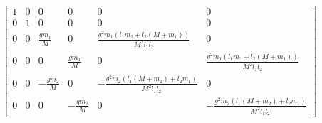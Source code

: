\documentclass[preview]{standalone}
\begin{document}
\begin{align*}
\left[\begin{matrix}1 & 0 & 0 & 0 & 0 & 0\\0 & 1 & 0 & 0 & 0 & 0\\0 & 0 & \frac{g m_{1}}{M} & 0 & \frac{g^{2} m_{1} \left(l_{1} m_{2} + l_{2} \left(M + m_{1}\right)\right)}{M^{2} l_{1} l_{2}} & 0\\0 & 0 & 0 & \frac{g m_{1}}{M} & 0 & \frac{g^{2} m_{1} \left(l_{1} m_{2} + l_{2} \left(M + m_{1}\right)\right)}{M^{2} l_{1} l_{2}}\\0 & 0 & - \frac{g m_{2}}{M} & 0 & - \frac{g^{2} m_{2} \left(l_{1} \left(M + m_{2}\right) + l_{2} m_{1}\right)}{M^{2} l_{1} l_{2}} & 0\\0 & 0 & 0 & - \frac{g m_{2}}{M} & 0 & - \frac{g^{2} m_{2} \left(l_{1} \left(M + m_{2}\right) + l_{2} m_{1}\right)}{M^{2} l_{1} l_{2}}\end{matrix}\right]
\end{align*}
\end{document}
